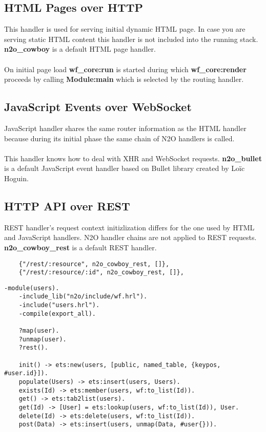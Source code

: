 \subsection{HTML Pages over HTTP}
This handler is used for serving initial dynamic HTML page.
In case you are serving static HTML content this handler is
not included into the running stack. {\bf {n2o}\_{cowboy}} is
a default HTML page handler.

\paragraph{}
On initial page load {\bf {wf}\_{core}:run} is started during
which {\bf {wf}\_{core}:render} proceeds by calling {\bf Module:main} which
is selected by the routing handler.

\subsection{JavaScript Events over WebSocket}
JavaScript handler shares the same router information as the
HTML handler because during its initial phase the same chain
of N2O handlers is called.

\paragraph{}
This handler knows how to deal with XHR and WebSocket requests.
{\bf {n2o}\_{bullet}} is a default JavaScript event handler
based on Bullet library created by Loïc Hoguin.

\newpage
\subsection{HTTP API over REST}
REST handler's request context initizlization differs for the one
used by HTML and JavaScript handlers. N2O handler chains are not
applied to REST requests. {\bf n2o\_cowboy\_rest} is a default REST
handler.

\vspace{1\baselineskip}
\begin{lstlisting}
    {"/rest/:resource", n2o_cowboy_rest, []},
    {"/rest/:resource/:id", n2o_cowboy_rest, []},
\end{lstlisting}

\vspace{1\baselineskip}
\begin{lstlisting}[caption=users.erl]
    -module(users).
    -include_lib("n2o/include/wf.hrl").
    -include("users.hrl").
    -compile(export_all).

    ?map(user).
    ?unmap(user).
    ?rest().

    init() -> ets:new(users, [public, named_table, {keypos, #user.id}]).
    populate(Users) -> ets:insert(users, Users).
    exists(Id) -> ets:member(users, wf:to_list(Id)).
    get() -> ets:tab2list(users).
    get(Id) -> [User] = ets:lookup(users, wf:to_list(Id)), User.
    delete(Id) -> ets:delete(users, wf:to_list(Id)).
    post(Data) -> ets:insert(users, unmap(Data, #user{})).
\end{lstlisting}
\vspace{1\baselineskip}

